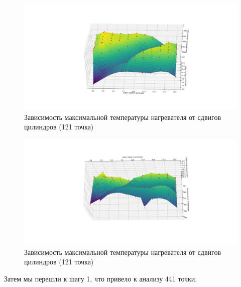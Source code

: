 \documentclass[a4paper,12pt]{article}
\theoremstyle{plain} %
\theoremstyle{definition} %
\theoremstyle{remark} %
\begin{document}
\begin{figure}[h]
	\begin{center}
		\includegraphics[width=0.4\linewidth]{17.1.jpg}
		\caption{Зависимость максимальной температуры нагревателя от сдвигов цилиндров (121 точка)} %
	\end{center}
\end{figure}
\begin{figure}[h]
	\begin{center}
		\includegraphics[width=0.4\linewidth]{17.2.jpg}
		\caption{Зависимость максимальной температуры нагревателя от сдвигов цилиндров (121 точка)} %
	\end{center}
\end{figure}

Затем мы перешли к шагу 1, что привело к анализу 441 точки.
\end{document}
